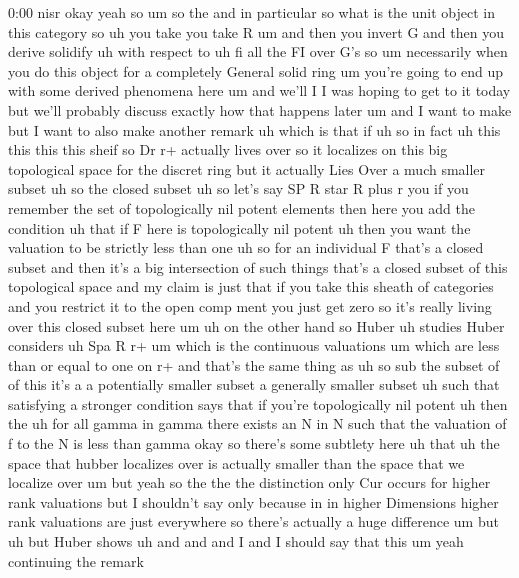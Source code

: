 \begin{unfinished}{0:00}
nisr  okay  yeah
so  um  so  the  and  in  particular  so  what
is  the  unit  object  in  this
category  so  uh  you  take  you  take  R  um
and  then  you  invert  G  and  then  you
derive
solidify  uh  with  respect
to  uh  fi  all  the  FI  over
G's
so
um  necessarily  when  you  do  this  object
for  a  completely  General  solid  ring  um
you're  going  to  end  up  with  some  derived
phenomena  here
um  and  we'll  I  I  was  hoping  to  get  to  it
today  but  we'll  probably  discuss  exactly
how  that  happens  later  um  and  I  want  to
make  but  I  want  to  also  make  another
remark  uh  which  is  that  if  uh  so  in
fact  uh  this  this  this  this  sheif  so  Dr
r+  actually  lives  over  so  it  localizes
on  this  big  topological  space  for  the
discret  ring  but  it  actually  Lies  Over  a
much  smaller  subset  uh  so  the  closed
subset
uh  so  let's  say  SP  R  star  R  plus  r  you
if  you  remember  the  set  of  topologically
nil  potent  elements  then  here  you  add
the
condition  uh  that  if  F  here  is
topologically  nil
potent  uh  then  you  want  the  valuation  to
be  strictly  less  than
one  uh
so  for  an  individual  F  that's  a  closed
subset  and  then  it's  a  big  intersection
of  such  things  that's  a  closed  subset  of
this  topological  space  and  my  claim  is
just  that  if  you  take  this  sheath  of
categories  and  you  restrict  it  to  the
open  comp  ment  you  just  get  zero  so  it's
really  living  over  this  closed  subset
here
um
uh  on  the  other
hand  so  Huber  uh
studies  Huber
considers  uh
Spa  R
r+  um  which  is  the  continuous
valuations  um  which  are  less  than  or
equal  to  one  on
r+  and  that's  the  same  thing  as  uh  so
sub  the  subset  of  of  this  it's  a  a
potentially  smaller  subset  a  generally
smaller
subset  uh  such  that  satisfying  a
stronger  condition  says  that  if  you're
topologically  nil  potent  uh  then  the
uh  for  all  gamma  in  gamma  there  exists
an  N  in  N  such  that  the  valuation  of  f
to  the  N  is  less  than  gamma  okay  so
there's  some  subtlety  here
uh  that  uh  the  space  that  hubber
localizes  over  is  actually  smaller  than
the  space  that  we  localize  over  um  but
yeah  so  the  the  the  distinction  only  Cur
occurs  for  higher  rank  valuations  but  I
shouldn't  say  only  because  in  in  higher
Dimensions  higher  rank  valuations  are
just  everywhere  so  there's  actually  a
huge  difference
um  but
uh  but  Huber
shows  uh  and  and  and  I  and  I  should  say
that  this  um  yeah  continuing  the  remark

\end{unfinished}
